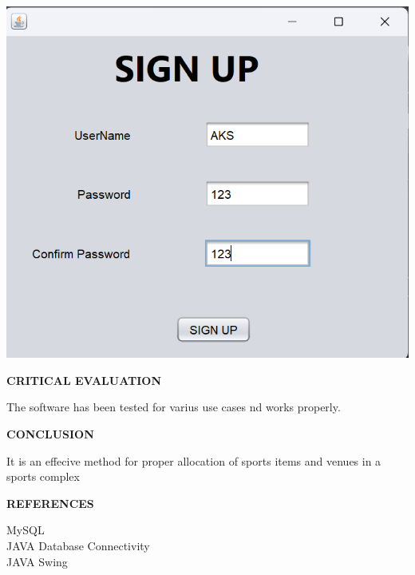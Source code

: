 \documentclass[a4paper,12pt]{report}
\begin{document}
\includegraphics[scale=0.5]{SIGNUP_PAGE.png}

\begin{flushleft}
		\textbf{CRITICAL EVALUATION} 
\end{flushleft} 
The software has been tested for varius use cases nd works properly.
\begin{flushleft}
		\textbf{CONCLUSION} 
\end{flushleft} 
It is an effecive method for proper allocation of sports items and venues in a sports complex 
\begin{flushleft}
		\textbf{REFERENCES} 
\end{flushleft} 
MySQL\\
JAVA Database Connectivity\\
JAVA Swing\\
\end{document}

